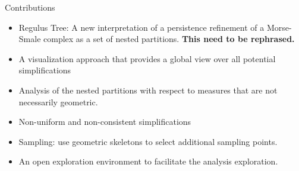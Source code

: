 \item Contributions
\begin{itemize}
    \item Regulus Tree: A new interpretation of a persistence refinement of a Morse-Smale complex as a set of nested partitions. \textbf{This need to be rephrased.}

    \item A visualization approach that provides a global view over all potential simplifications  

    \item Analysis of the nested partitions with respect to measures that are not necessarily geometric. 

    \item Non-uniform and non-consistent simplifications
    
    \item Sampling: use geometric skeletons to select additional sampling points.
    
    \item An open exploration environment to facilitate the analysis exploration. 
\end{itemize}


